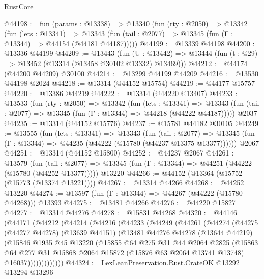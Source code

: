 \begin{lexlean}{RustCore}
\begin{coremodule}
@44198 := fun (params : @13338) =>
  @13340
    (fun (rty : @2050) =>
    @13342
      (fun (lets : @13341) =>
      @13343 (fun (tail : @2077) => @13345 (fun (Γ : @13344) => @44154 (@44181 @44187)))))
@44199 := @13339 @44198
@44200 := @13336 @44199
@44209 := @13443
    (fun (U : @13442) => @13444 (fun (t : @29) => @13452 (@13314 (@13458 @30102 @13332) @13469)))
@44212 := @44174 (@44200 @44209) @30100
@44214 := @13299 @44199 @44209
@44216 := @13530 @44198 @2024
@44218 := @13314 (@44152 @15754)
@44219 := @44177 @15757
@44220 := @13386 @44219
@44222 := @13314 (@44220 @13407)
@44233 := @13533
    (fun (rty : @2050) =>
    @13342
      (fun (lets : @13341) =>
      @13343 (fun (tail : @2077) => @13345 (fun (Γ : @13344) => @44218 (@44222 @44187)))))
    @2037
@44235 := @13314 (@44152 @15776)
@44237 := @15781 @44182 @30105
@44249 := @13555
    (fun (lets : @13341) =>
    @13343
      (fun (tail : @2077) =>
      @13345 (fun (Γ : @13344) => @44235 (@44222 (@15780 (@44237 @13375 @13377))))))
    @2067
@44251 := @13314 (@44152 @15800)
@44252 := @44237 @2067
@44261 := @13579
    (fun (tail : @2077) => @13345 (fun (Γ : @13344) => @44251 (@44222 (@15780 (@44252 @13377)))))
    @13220
@44266 := @44152 (@13364 (@15752 (@15773 (@13374 @13221))))
@44267 := @13314 @44266
@44268 := @44252 @13220
@44274 := @13597 (fun (Γ : @13344) => @44267 (@44222 (@15780 @44268))) @13393
@44275 := @13481 @44266
@44276 := @44220 @15827
@44277 := @13314 @44276
@44278 := @15831 @44268
@44320 := @44146
    (@44171
      (@44212
        (@44214
          (@44216
            (@44233
              (@44249
                (@44261
                  (@44274
                    (@44275
                      (@44277 @44278)
                      (@13639 @44151)
                      (@13481
                        @44276
                        @44278
                        (@13644 @44219)
                        (@15846
                          @1935
                          @45
                          @13220
                          (@15855
                            @64
                            @275
                            @31
                            @44
                            @2064
                            @2825
                            (@15863
                              @64
                              @277
                              @31
                              @15868
                              @2064
                              @15872
                              (@15876 @63 @2064 @13741 @13748)
                              @16037)))))))))))))
@44324 := LexLeanPreservation.Rust.CrateOK @13292 @13294 @13296

\end{coremodule}
\end{lexlean}
